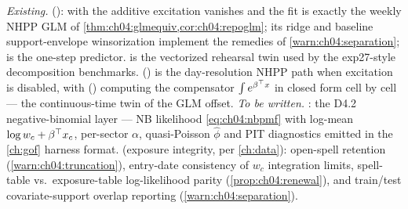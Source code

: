 \begin{codehooks}
\emph{Existing.} 
(): with  the additive
excitation vanishes and the fit is exactly the weekly NHPP GLM of
\cref{thm:ch04:glmequiv,cor:ch04:repoglm}; its ridge  and
baseline support-envelope winsorization implement the remedies of
\cref{warn:ch04:separation};  is the one-step
predictor. 
is the vectorized rehearsal twin used by the exp27-style decomposition
benchmarks. 
() is the day-resolution NHPP
path when excitation is disabled, with
() computing the
compensator $\int e^{\beta^{\top}x}$ in closed form cell by cell ---
the continuous-time twin of the GLM offset. \emph{To be written.}
: the D4.2 negative-binomial layer ---
NB likelihood \cref{eq:ch04:nbpmf} with log-mean $\log w_c +
\beta^{\top}x_c$, per-sector $\alpha$, quasi-Poisson $\hat\phi$ and PIT
diagnostics emitted in the \cref{ch:gof} harness format.
 (exposure integrity, per \cref{ch:data}):
open-spell retention (\cref{warn:ch04:truncation}), entry-date
consistency of $w_c$ integration limits, spell-table vs.\ exposure-table
log-likelihood parity (\cref{prop:ch04:renewal}), and train/test
covariate-support overlap reporting (\cref{warn:ch04:separation}).
\end{codehooks}
